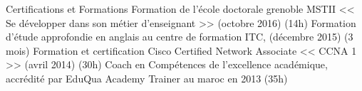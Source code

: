 \begin{rubric}{Certifications et Formations}
\entry*[]	 Formation de l'école doctorale grenoble MSTII << Se développer dans son métier d'enseignant >> (octobre 2016) (14h)	
\entry*[]	 Formation d'étude approfondie en anglais au centre de formation ITC, (décembre 2015) (3 mois) 
\entry*[]	 Formation et certification Cisco Certified Network Associate << CCNA 1 >> (avril 2014) (30h)
    \entry*[] Coach en Compétences de l'excellence académique, accrédité par EduQua Academy Trainer au maroc en 2013 (35h)
\end{rubric}
